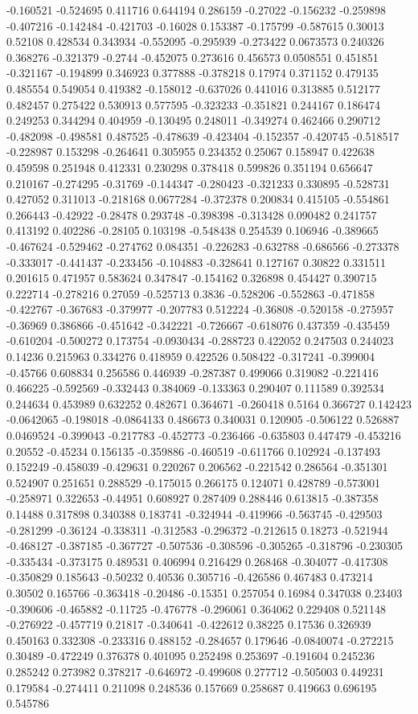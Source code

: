 -0.160521 -0.524695 0.411716 0.644194 0.286159 -0.27022 -0.156232 -0.259898 -0.407216 -0.142484 -0.421703 -0.16028 0.153387 -0.175799 -0.587615 0.30013 0.52108 0.428534 0.343934 -0.552095 -0.295939 -0.273422 0.0673573 0.240326 0.368276 -0.321379 -0.2744 -0.452075 0.273616 0.456573 0.0508551 0.451851 -0.321167 -0.194899 0.346923 0.377888 -0.378218 0.17974 0.371152 0.479135 0.485554 0.549054 0.419382 -0.158012 -0.637026 0.441016 0.313885 0.512177 0.482457 0.275422 0.530913 0.577595 -0.323233 -0.351821 0.244167 0.186474 0.249253 0.344294 0.404959 -0.130495 0.248011 -0.349274 0.462466 0.290712 -0.482098 -0.498581 0.487525 -0.478639 -0.423404 -0.152357 -0.420745 -0.518517 -0.228987 0.153298 -0.264641 0.305955 0.234352 0.25067 0.158947 0.422638 0.459598 0.251948 0.412331 0.230298 0.378418 0.599826 0.351194 0.656647 0.210167 -0.274295 -0.31769 -0.144347 -0.280423 -0.321233 0.330895 -0.528731 0.427052 0.311013 -0.218168 0.0677284 -0.372378 0.200834 0.415105 -0.554861 0.266443 -0.42922 -0.28478 0.293748 -0.398398 -0.313428 0.090482 0.241757 0.413192 0.402286 -0.28105 0.103198 -0.548438 0.254539 0.106946 -0.389665 -0.467624 -0.529462 -0.274762 0.084351 -0.226283 -0.632788 -0.686566 -0.273378 -0.333017 -0.441437 -0.233456 -0.104883 -0.328641 0.127167 0.30822 0.331511 0.201615 0.471957 0.583624 0.347847 -0.154162 0.326898 0.454427 0.390715 0.222714 -0.278216 0.27059 -0.525713 0.3836 -0.528206 -0.552863 -0.471858 -0.422767 -0.367683 -0.379977 -0.207783 0.512224 -0.36808 -0.520158 -0.275957 -0.36969 0.386866 -0.451642 -0.342221 -0.726667 -0.618076 0.437359 -0.435459 -0.610204 -0.500272 0.173754 -0.0930434 -0.288723 0.422052 0.247503 0.244023 0.14236 0.215963 0.334276 0.418959 0.422526 0.508422 -0.317241 -0.399004 -0.45766 0.608834 0.256586 0.446939 -0.287387 0.499066 0.319082 -0.221416 0.466225 -0.592569 -0.332443 0.384069 -0.133363 0.290407 0.111589 0.392534 0.244634 0.453989 0.632252 0.482671 0.364671 -0.260418 0.5164 0.366727 0.142423 -0.0642065 -0.198018 -0.0864133 0.486673 0.340031 0.120905 -0.506122 0.526887 0.0469524 -0.399043 -0.217783 -0.452773 -0.236466 -0.635803 0.447479 -0.453216 0.20552 -0.45234 0.156135 -0.359886 -0.460519 -0.611766 0.102924 -0.137493 0.152249 -0.458039 -0.429631 0.220267 0.206562 -0.221542 0.286564 -0.351301 0.524907 0.251651 0.288529 -0.175015 0.266175 0.124071 0.428789 -0.573001 -0.258971 0.322653 -0.44951 0.608927 0.287409 0.288446 0.613815 -0.387358 0.14488 0.317898 0.340388 0.183741 -0.324944 -0.419966 -0.563745 -0.429503 -0.281299 -0.36124 -0.338311 -0.312583 -0.296372 -0.212615 0.18273 -0.521944 -0.468127 -0.387185 -0.367727 -0.507536 -0.308596 -0.305265 -0.318796 -0.230305 -0.335434 -0.373175 0.489531 0.406994 0.216429 0.268468 -0.304077 -0.417308 -0.350829 0.185643 -0.50232 0.40536 0.305716 -0.426586 0.467483 0.473214 0.30502 0.165766 -0.363418 -0.20486 -0.15351 0.257054 0.16984 0.347038 0.23403 -0.390606 -0.465882 -0.11725 -0.476778 -0.296061 0.364062 0.229408 0.521148 -0.276922 -0.457719 0.21817 -0.340641 -0.422612 0.38225 0.17536 0.326939 0.450163 0.332308 -0.233316 0.488152 -0.284657 0.179646 -0.0840074 -0.272215 0.30489 -0.472249 0.376378 0.401095 0.252498 0.253697 -0.191604 0.245236 0.285242 0.273982 0.378217 -0.646972 -0.499608 0.277712 -0.505003 0.449231 0.179584 -0.274411 0.211098 0.248536 0.157669 0.258687 0.419663 0.696195 0.545786 